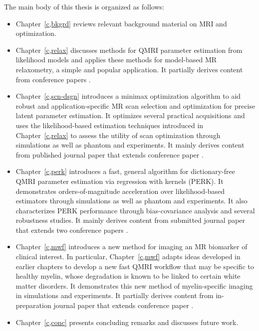 The main body of this thesis is organized as follows:
\begin{itemize}
\setlength\itemsep{0.5em}
	\item{%
		Chapter~\ref{c,bkgrd} reviews 
		relevant background material
		on MRI and optimization.
	}%
	\item{%
		Chapter~\ref{c,relax} discusses methods 
		for QMRI parameter estimation 
		from likelihood models 
		and applies these methods 
		for model-based MR relaxometry,
		a simple and popular application.
		It partially derives content
		from conference papers 
		\cite{nataraj:14:rje,nataraj:14:mbe}.
	}%
	\item{%
		Chapter~\ref{c,scn-dsgn} introduces
		a minimax optimization algorithm
		to aid robust and application-specific 
		MR scan selection and optimization 
		for precise latent parameter estimation.
		It optimizes several practical acquisitions 
		and uses the likelihood-based estimation techniques 
		introduced in Chapter~\ref{c,relax}
		to assess the utility
		of scan optimization
		through simulations 
		as well as phantom and \invivo experiments.
		It mainly derives content
		from published journal paper
		\cite{nataraj:17:oms}
		that extends conference paper
		\cite{nataraj:15:amm}.
	}%
	\item{%
		Chapter~\ref{c,perk} introduces
		a fast, general algorithm
		for dictionary-free QMRI parameter estimation
		via regression with kernels (PERK).
		It demonstrates orders-of-magnitude acceleration 
		over likelihood-based estimators
		through simulations
		as well as phantom and \invivo experiments.
		It also characterizes PERK performance
		through bias-covariance analysis 
		and several robustness studies.
		It mainly derives content 
		from submitted journal paper
		\cite{nataraj:17:dfm-arxiv} 
		that extends two conference papers
		\cite{nataraj:17:dfm,nataraj:17:slw}.
	}%
	\item{%
		Chapter~\ref{c,mwf} introduces a new method 
		for imaging an MR biomarker of clinical interest. 
		In particular,
		Chapter~\ref{c,mwf} adapts ideas developed in earlier chapters
		to develop a new fast QMRI workflow
		that may be specific to healthy myelin,
		whose degradation is known to be linked
		to certain white matter disorders.
		It demonstrates this new method of myelin-specific imaging
		in simulations and \invivo experiments.
		It partially derives content 
		from in-preparation journal paper \cite{nataraj::fmw}
		that extends conference paper \cite{nataraj:17:mwf}.
	}%
	\item{%
		Chapter~\ref{c,conc} presents concluding remarks
		and discusses future work.
	}%
\end{itemize}

